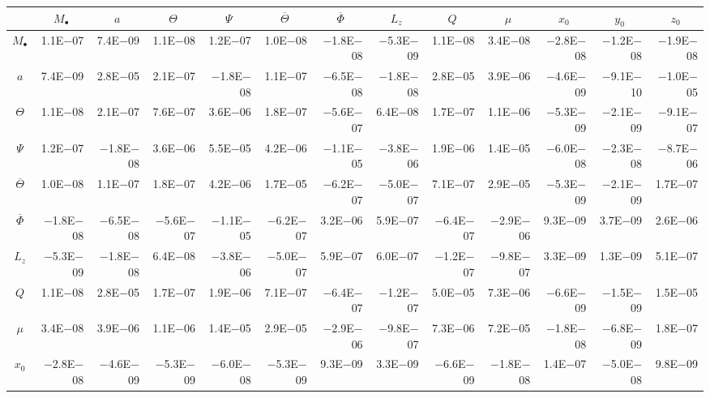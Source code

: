 \begin{sidewaystable}[htbp]\scriptsize
\centering
\begin{tabular}{crrrrrrrrrrrr}
\toprule
 & \multicolumn{1}{c}{$M_\bullet$} & \multicolumn{1}{c}{$a$} & \multicolumn{1}{c}{$\Theta$} & \multicolumn{1}{c}{$\Psi$} & \multicolumn{1}{c}{$\overline{\Theta}$} & \multicolumn{1}{c}{$\overline{\Phi}$} & \multicolumn{1}{c}{$L_z$} & \multicolumn{1}{c}{$Q$} & \multicolumn{1}{c}{$\mu$} & \multicolumn{1}{c}{$x_0$} & \multicolumn{1}{c}{$y_0$} & \multicolumn{1}{c}{$z_0$} \\ \midrule 
$M_\bullet$ & 1.1E$-$07 & 7.4E$-$09 & 1.1E$-$08 & 1.2E$-$07 & 1.0E$-$08 & $-$1.8E$-$08 & $-$5.3E$-$09 & 1.1E$-$08 & 3.4E$-$08 & $-$2.8E$-$08 & $-$1.2E$-$08 & $-$1.9E$-$08 \\
$a$ & 7.4E$-$09 & 2.8E$-$05 & 2.1E$-$07 & $-$1.8E$-$08 & 1.1E$-$07 & $-$6.5E$-$08 & $-$1.8E$-$08 & 2.8E$-$05 & 3.9E$-$06 & $-$4.6E$-$09 & $-$9.1E$-$10 & $-$1.0E$-$05 \\
$\Theta$ & 1.1E$-$08 & 2.1E$-$07 & 7.6E$-$07 & 3.6E$-$06 & 1.8E$-$07 & $-$5.6E$-$07 & 6.4E$-$08 & 1.7E$-$07 & 1.1E$-$06 & $-$5.3E$-$09 & $-$2.1E$-$09 & $-$9.1E$-$07 \\
$\Psi$ & 1.2E$-$07 & $-$1.8E$-$08 & 3.6E$-$06 & 5.5E$-$05 & 4.2E$-$06 & $-$1.1E$-$05 & $-$3.8E$-$06 & 1.9E$-$06 & 1.4E$-$05 & $-$6.0E$-$08 & $-$2.3E$-$08 & $-$8.7E$-$06 \\
$\overline{\Theta}$ & 1.0E$-$08 & 1.1E$-$07 & 1.8E$-$07 & 4.2E$-$06 & 1.7E$-$05 & $-$6.2E$-$07 & $-$5.0E$-$07 & 7.1E$-$07 & 2.9E$-$05 & $-$5.3E$-$09 & $-$2.1E$-$09 & 1.7E$-$07 \\
$\overline{\Phi}$ & $-$1.8E$-$08 & $-$6.5E$-$08 & $-$5.6E$-$07 & $-$1.1E$-$05 & $-$6.2E$-$07 & 3.2E$-$06 & 5.9E$-$07 & $-$6.4E$-$07 & $-$2.9E$-$06 & 9.3E$-$09 & 3.7E$-$09 & 2.6E$-$06 \\
$L_z$ & $-$5.3E$-$09 & $-$1.8E$-$08 & 6.4E$-$08 & $-$3.8E$-$06 & $-$5.0E$-$07 & 5.9E$-$07 & 6.0E$-$07 & $-$1.2E$-$07 & $-$9.8E$-$07 & 3.3E$-$09 & 1.3E$-$09 & 5.1E$-$07 \\
$Q$ & 1.1E$-$08 & 2.8E$-$05 & 1.7E$-$07 & 1.9E$-$06 & 7.1E$-$07 & $-$6.4E$-$07 & $-$1.2E$-$07 & 5.0E$-$05 & 7.3E$-$06 & $-$6.6E$-$09 & $-$1.5E$-$09 & 1.5E$-$05 \\
$\mu$ & 3.4E$-$08 & 3.9E$-$06 & 1.1E$-$06 & 1.4E$-$05 & 2.9E$-$05 & $-$2.9E$-$06 & $-$9.8E$-$07 & 7.3E$-$06 & 7.2E$-$05 & $-$1.8E$-$08 & $-$6.8E$-$09 & 1.8E$-$07 \\
$x_0$ & $-$2.8E$-$08 & $-$4.6E$-$09 & $-$5.3E$-$09 & $-$6.0E$-$08 & $-$5.3E$-$09 & 9.3E$-$09 & 3.3E$-$09 & $-$6.6E$-$09 & $-$1.8E$-$08 & 1.4E$-$07 & $-$5.0E$-$08 & 9.8E$-$09 \\

\end{tabular}
\end{sidewaystable}
